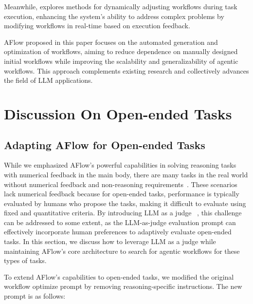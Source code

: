\documentclass{article} %
\newcommand{\model}{{\sc AFlow}\xspace}
\theoremstyle{plain}
\theoremstyle{definition}
\theoremstyle{remark}
\begin{document}
Meanwhile, \cite{niu2025flow} explores methods for dynamically adjusting workflows during task execution, enhancing the system's ability to address complex problems by modifying workflows in real-time based on execution feedback.

\model proposed in this paper focuses on the automated generation and optimization of workflows, aiming to reduce dependence on manually designed initial workflows while improving the scalability and generalizability of agentic workflows. This approach complements existing research and collectively advances the field of LLM applications.


\section{Discussion On Open-ended Tasks}
\label{appendix:discussion}
\subsection{Adapting \model for Open-ended Tasks}

While we emphasized \model's powerful capabilities in solving reasoning tasks with numerical feedback in the main body, there are many tasks in the real world without numerical feedback and non-reasoning requirements~\citep{dai2024mmrole}. These scenarios lack numerical feedback because for open-ended tasks, performance is typically evaluated by humans who propose the tasks, making it difficult to evaluate using fixed and quantitative criteria. By introducing LLM as a judge ~\citep{zheng2023judging}, this challenge can be addressed to some extent, as the LLM-as-judge evaluation prompt can effectively incorporate human preferences to adaptively evaluate open-ended tasks. In this section, we discuss how to leverage LLM as a judge while maintaining \model's core architecture to search for agentic workflows for these types of tasks.

To extend \model's capabilities to open-ended tasks, we modified the original workflow optimize prompt by removing reasoning-specific instructions. The new prompt is as follows: 

\label{appendix:modified prompt}
\end{document}
